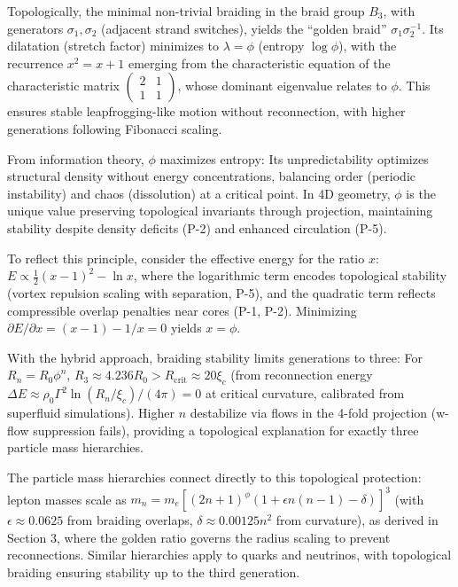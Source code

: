 Topologically, the minimal non-trivial braiding in the braid group $B_3$, with generators $\sigma_1, \sigma_2$ (adjacent strand switches), yields the ``golden braid'' $\sigma_1 \sigma_2^{-1}$. Its dilatation (stretch factor) minimizes to $\lambda = \phi$ (entropy $\log \phi$), with the recurrence $x^2 = x + 1$ emerging from the characteristic equation of the characteristic matrix $\begin{pmatrix} 2 & 1 \\ 1 & 1 \end{pmatrix}$, whose dominant eigenvalue relates to $\phi$. This ensures stable leapfrogging-like motion without reconnection, with higher generations following Fibonacci scaling.

From information theory, $\phi$ maximizes entropy: Its unpredictability optimizes structural density without energy concentrations, balancing order (periodic instability) and chaos (dissolution) at a critical point. In 4D geometry, $\phi$ is the unique value preserving topological invariants through projection, maintaining stability despite density deficits (P-2) and enhanced circulation (P-5).

To reflect this principle, consider the effective energy for the ratio $x$: $E \propto \frac{1}{2} (x - 1)^2 - \ln x$, where the logarithmic term encodes topological stability (vortex repulsion scaling with separation, P-5), and the quadratic term reflects compressible overlap penalties near cores (P-1, P-2). Minimizing $\partial E / \partial x = (x - 1) - 1/x = 0$ yields $x = \phi$.

With the hybrid approach, braiding stability limits generations to three: For $R_n = R_0 \phi^n$, $R_3 \approx 4.236 R_0 > R_{\text{crit}} \approx 20 \xi_c$ (from reconnection energy $\Delta E \approx \rho_0 \Gamma^2 \ln(R_n / \xi_c) / (4\pi) = 0$ at critical curvature, calibrated from superfluid simulations). Higher $n$ destabilize via flows in the 4-fold projection (w-flow suppression fails), providing a topological explanation for exactly three particle mass hierarchies.

The particle mass hierarchies connect directly to this topological protection: lepton masses scale as $m_n = m_e [(2n+1)^\phi (1 + \epsilon n(n-1) - \delta)]^3$ (with $\epsilon \approx 0.0625$ from braiding overlaps, $\delta \approx 0.00125 n^2$ from curvature), as derived in Section 3, where the golden ratio governs the radius scaling to prevent reconnections. Similar hierarchies apply to quarks and neutrinos, with topological braiding ensuring stability up to the third generation.

